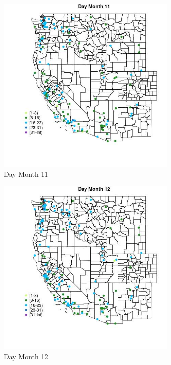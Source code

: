 \begin{figure} 
\centering  
\includegraphics[width=0.77\textwidth]{Code_Outputs/Report_ML_input_PM25_Step4_part_e_de_duplicated_aves_MapObsMo11Day.jpg} 
\caption{\label{fig:Report_ML_input_PM25_Step4_part_e_de_duplicated_avesMapObsMo11Day}Day Month 11} 
\end{figure} 
 

\begin{figure} 
\centering  
\includegraphics[width=0.77\textwidth]{Code_Outputs/Report_ML_input_PM25_Step4_part_e_de_duplicated_aves_MapObsMo12Day.jpg} 
\caption{\label{fig:Report_ML_input_PM25_Step4_part_e_de_duplicated_avesMapObsMo12Day}Day Month 12} 
\end{figure} 
 

